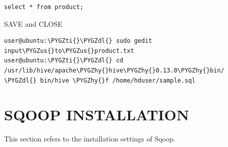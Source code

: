 \documentclass[letterpaper,10pt,english]{sphinxmanual}
\def\PYGZus{\char`\_}
\def\PYGZdl{\char`\$}
\def\PYGZhy{\char`\-}
\def\PYGZti{\char`\~}
\begin{document}
\begin{Verbatim}[commandchars=\\\{\}]
select * from product;
\end{Verbatim}

SAVE and CLOSE

\begin{Verbatim}[commandchars=\\\{\}]
user@ubuntu:\PYGZti{}\PYGZdl{} sudo gedit input\PYGZus{}to\PYGZus{}product.txt
user@ubuntu:\PYGZti{}\PYGZdl{} cd /usr/lib/hive/apache\PYGZhy{}hive\PYGZhy{}0.13.0\PYGZhy{}bin/ \PYGZdl{} bin/hive \PYGZhy{}f /home/hduser/sample.sql
\end{Verbatim}


\chapter{SQOOP INSTALLATION}
\label{sqoop::doc}\label{sqoop:sqoop-installation}
This section refers to the installation settings of Sqoop.
\end{document}
